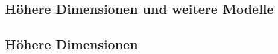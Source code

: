 \documentclass[11pt]{book}
\numberwithin{dummy}{section}
\theoremstyle{nonumberbreak}
\begin{document}
\begin{spacing}{1.4}
\newpage
\thispagestyle{empty}


































































\chapter{Höhere Dimensionen und weitere Modelle} %
\setlength\abovedisplayshortskip{0pt}
\setlength\belowdisplayshortskip{10pt}
\setlength\abovedisplayskip{10pt}
\setlength\belowdisplayskip{10pt}
 



\section{Höhere Dimensionen} %

\thispagestyle{empty}



\end{spacing}
\end{document}
